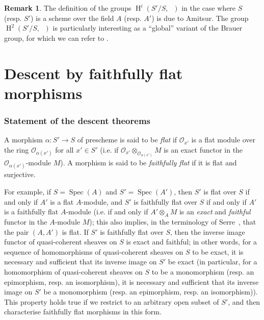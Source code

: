 \documentclass{article}
\theoremstyle{plain}
\theoremstyle{definition}
\newenvironment{definition}[1]
  {\renewcommand\theinnercustomdefinition{#1}\innercustomdefinition}
  {\endinnercustomdefinition}
\newtheorem*{remark}{Remark}
\newcommand{\sh}[1]{{\mathscr{#1}}}
\DeclareMathOperator{\HH}{H}
\DeclareMathOperator{\Gm}{G_m}
\DeclareMathOperator{\Spec}{Spec}
\newcommand{\oldpage}[1]{\marginpar{\footnotesize$\Big\vert$ \textit{p.~#1}}}
\begin{document}
\begin{remark}
  The definition of the groups $\HH^i(S'/S,\Gm)$ in the case where $S$ (resp. $S'$) is a scheme over the field $A$ (resp. $A'$) is due to Amitsur.
  The group $\HH^2(S'/S,\Gm)$ is particularly interesting as a ``global'' variant of the Brauer group, for which we can refer to \cite[chap.~VII]{1}.
\end{remark}



\part{Descent by faithfully flat morphisms}
\label{B}

\section{Statement of the descent theorems}
\label{B.1}

\begin{definition}{1.1}
  A morphism $\alpha\colon S'\to S$ of prescheme is said to be \emph{flat} if $\sh{O}_{x'}$ is a flat module over the ring $\sh{O}_{\alpha(x')}$ for all $x'\in S'$ (i.e. if $\sh{O}_{x'}\otimes_{\sh{O}_{\alpha(x')}}M$ is an exact functor in the $\sh{O}_{\alpha(x')}$-module $M$).
  A morphism is said to be \emph{faithfully flat} if it is flat and surjective.
\end{definition}

For example, if $S=\Spec(A)$ and $S'=\Spec(A')$, then $S'$ is flat over $S$ if and only if $A'$ is a flat $A$-module, and $S'$ is faithfully flat over $S$ if and only if $A'$ is a faithfully flat $A$-module (i.e. if and only if $A'\otimes_A M$ is an \emph{exact} and \emph{faithful} functor in the $A$-module $M$);
this also implies, in the terminology of Serre~\cite{5}, that the pair $(A,A')$ is flat.
If $S'$ is faithfully flat over $S$, then the inverse image functor of quasi-coherent sheaves on $S$ is exact and faithful;
in other words, for a sequence of homomorphisms of
\oldpage{190-17}
quasi-coherent sheaves on $S$ to be exact, it is necessary and sufficient that its inverse image on $S'$ be exact (in particular, for a homomorphism of quasi-coherent sheaves on $S$ to be a monomorphism (resp. an epimorphism, resp. an isomorphism), it is necessary and sufficient that its inverse image on $S'$ be a monomorphism (resp. an epimorphism, resp. an isomorphism)).
This property holds true if we restrict to an arbitrary open subset of $S'$, and then characterise faithfully flat morphisms in this form.
\end{document}
